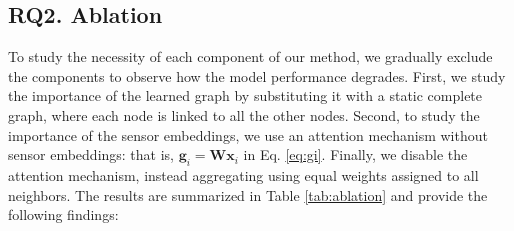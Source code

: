 \documentclass[letterpaper]{article} %
\begin{document}



\subsection{RQ2. Ablation}
To study the necessity of each component of our method, we gradually exclude the components to observe how the model performance degrades. First, we study the importance of the learned graph by substituting it with a static complete graph, where each node is linked to all the other nodes. Second, to study the importance of the sensor embeddings, we use an attention mechanism without sensor embeddings: that is, $\mathbf{g}_{i} = \mathbf{W} \mathbf{x}_{i}$ in Eq. \eqref{eq:gi}. Finally, we disable the attention mechanism, instead aggregating using equal weights assigned to all neighbors. The results are summarized in Table \ref{tab:ablation} and provide the following findings:
\end{document}
